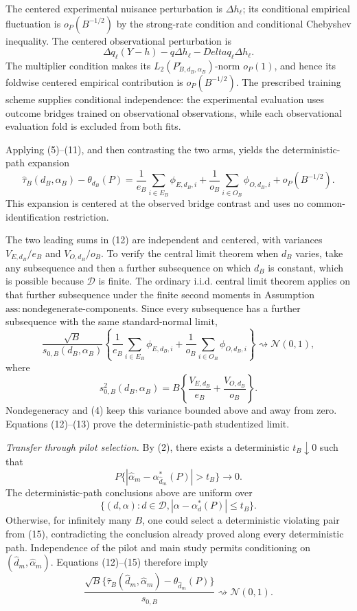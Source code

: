 The centered experimental nuisance perturbation is \(\Delta h_\ell\); its conditional empirical fluctuation is \(o_P(B^{-1/2})\) by the strong-rate condition and conditional Chebyshev inequality.  The centered observational perturbation is
\[
 \Delta q_\ell(Y-h)-q\Delta h_\ell-Delta q_\ell\Delta h_\ell. \tag{11}
\]
The multiplier condition makes its \(L_2(P_{B,d_B,\alpha_B}^{\circ})\)-norm \(o_P(1)\), and hence its foldwise centered empirical contribution is \(o_P(B^{-1/2})\).  The prescribed training scheme supplies conditional independence: the experimental evaluation uses outcome bridges trained on observational observations, while each observational evaluation fold is excluded from both fits.

Applying (5)--(11), and then contrasting the two arms, yields the deterministic-path expansion
\[
 \widehat\tau_B(d_B,\alpha_B)-\theta_{d_B}(P)
 =\frac1{e_B}\sum_{i\in E_B}\phi_{E,d_B,i}
 +\frac1{o_B}\sum_{i\in O_B}\phi_{O,d_B,i}
 +o_P(B^{-1/2}).                                               \tag{12}
\]
This expansion is centered at the observed bridge contrast and uses no common-identification restriction.

The two leading sums in (12) are independent and centered, with variances \(V_{E,d_B}/e_B\) and \(V_{O,d_B}/o_B\).  To verify the central limit theorem when \(d_B\) varies, take any subsequence and then a further subsequence on which \(d_B\) is constant, which is possible because \(\mathcal D\) is finite.  The ordinary i.i.d. central limit theorem applies on that further subsequence under the finite second moments in Assumption~\(\mathrm{ass{:}nondegenerate\text{-}components}\).  Since every subsequence has a further subsequence with the same standard-normal limit,
\[
 \frac{\sqrt B}{s_{0,B}(d_B,\alpha_B)}
 \left\{
 \frac1{e_B}\sum_{i\in E_B}\phi_{E,d_B,i}
 +\frac1{o_B}\sum_{i\in O_B}\phi_{O,d_B,i}
 \right\}
 \rightsquigarrow\mathcal N(0,1),                             \tag{13}
\]
where
\[
 s_{0,B}^2(d_B,\alpha_B)
 =B\left\{\frac{V_{E,d_B}}{e_B}+\frac{V_{O,d_B}}{o_B}\right\}.
\]
Nondegeneracy and (4) keep this variance bounded above and away from zero.  Equations (12)--(13) prove the deterministic-path studentized limit.

\emph{Transfer through pilot selection.}
By (2), there exists a deterministic \(t_B\downarrow0\) such that
\[
 P\{|\widehat\alpha_m-\alpha_{\widehat d_m}^*(P)|>t_B\}
 \longrightarrow0.                                           \tag{14}
\]
The deterministic-path conclusions above are uniform over
\[
 \{(d,\alpha):d\in\mathcal D,
 |\alpha-\alpha_d^*(P)|\le t_B\}.                             \tag{15}
\]
Otherwise, for infinitely many \(B\), one could select a deterministic violating pair from (15), contradicting the conclusion already proved along every deterministic path.  Independence of the pilot and main study permits conditioning on \((\widehat d_m,\widehat\alpha_m)\).  Equations (12)--(15) therefore imply
\[
 \frac{\sqrt B\{\widehat\tau_B(\widehat d_m,\widehat\alpha_m)
 -\theta_{\widehat d_m}(P)\}}{s_{0,B}}
 \rightsquigarrow\mathcal N(0,1).                             \tag{16}
\]

